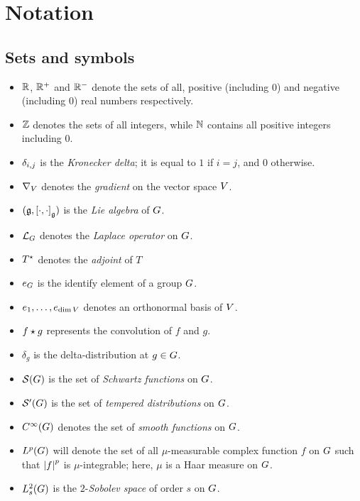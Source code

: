 \chapter*{Notation}

\section*{Sets and symbols}

\begin{itemize}
    \item $\mathbb{R}$, $\mathbb{R}^+$ and $\mathbb{R}^-$ denote the sets of all, positive (including $0$) and negative (including $0$) real numbers respectively.
    \item $\mathbb{Z}$ denotes the sets of all integers,
        while $\mathbb{N}$ contains all positive integers including $0$.
    \item $\delta_{i,j}$ is the \emph{Kronecker delta};
        it is equal to $1$ if $i = j$,
        and $0$ otherwise.
    \item $\nabla_{V}$ denotes the \emph{gradient} on the vector space $V$.
    \item $(\mathfrak{g}, {[\cdot, \cdot]}_{\mathfrak{g}})$ is the \emph{Lie algebra} of $G$.
    \item ${\mathcal{L}_{G}}$ denotes the \emph{Laplace operator} on $G$.
    \item ${T}^\star$ denotes the \emph{adjoint} of $T$
    \item $e_G$ is the identify element of a group $G$.
    \item $e_1, \dots, e_{\dim V}$ denotes an orthonormal basis of $V$.
    \item $f \star g$ represents the convolution of $f$ and $g$.
    \item $\delta_g$ is the delta-distribution at $g \in G$.
    \item ${\mathcal{S} (G)}$ is the set of \emph{Schwartz functions} on $G$.
    \item ${\mathcal{S}' (G)}$ is the set of \emph{tempered distributions} on $G$.
    \item ${C^\infty(G)}$ denotes the set of \emph{smooth functions} on $G$.
    \item ${L^{p} (G)}$ will denote the set of all $\mu$-measurable complex function $f$ on $G$ such that $\left|{f}\right|^p$ is $\mu$-integrable;
        here, $\mu$ is a Haar measure on $G$.
    \item $L^2_{s}(G)$ is the $2$-\emph{Sobolev space} of order $s$ on $G$.

\end{itemize}
